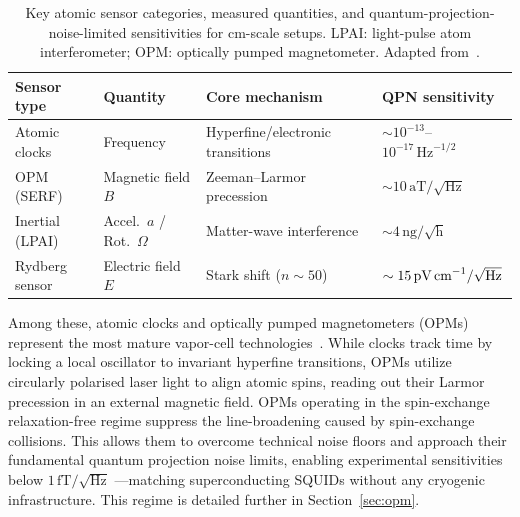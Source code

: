 \begin{table}[htbp]
    \centering
    \caption{Key atomic sensor categories, measured quantities,
             and quantum-projection-noise-limited sensitivities
             for cm-scale setups.
             \gls{LPAI}: light-pulse atom interferometer;
             \gls{OPM}: optically pumped magnetometer.
             Adapted from~\protect\cite{brown2025}.}
    \label{tab:sensor_types}
    \renewcommand{\arraystretch}{1.25}
    \small
    \begin{tabular}{@{}llll@{}}
        \toprule
        \textbf{Sensor type}
          & \textbf{Quantity}
          & \textbf{Core mechanism}
          & \textbf{QPN sensitivity} \\
        \midrule
        Atomic clocks
          & Frequency
          & Hyperfine/electronic transitions
          & $\sim10^{-13}$--$10^{-17}\,\text{Hz}^{-1/2}$ \\
        OPM (SERF)
          & Magnetic field $B$
          & Zeeman--Larmor precession
          & $\sim10\,\text{aT}/\sqrt{\text{Hz}}$ \\
        Inertial (LPAI)
          & Accel.~$a$ / Rot.~$\Omega$
          & Matter-wave interference
          & $\sim4\,\text{ng}/\sqrt{\text{h}}$ \\
        Rydberg sensor
          & Electric field $E$
          & Stark shift ($n\sim50$)
          & $\sim15\,\text{pV\,cm}^{-1}/\sqrt{\text{Hz}}$ \\
        \bottomrule
    \end{tabular}
\end{table}

Among these, atomic clocks and optically pumped magnetometers (OPMs) 
represent the most mature vapor-cell technologies~\cite{kitching2011}. 
While clocks track time by locking a local oscillator to invariant 
hyperfine transitions, OPMs utilize circularly polarised laser light 
to align atomic spins, reading out their Larmor precession in an external 
magnetic field. OPMs operating in the spin-exchange relaxation-free 
regime suppress the line-broadening caused by spin-exchange collisions. 
This allows them to overcome technical noise floors and approach their 
fundamental quantum projection noise limits, enabling experimental 
sensitivities below $1\,\text{fT}/\sqrt{\text{Hz}}$ ---matching 
superconducting \gls{SQUIDs} without any cryogenic infrastructure. This regime 
is detailed further in Section~\ref{sec:opm}.


